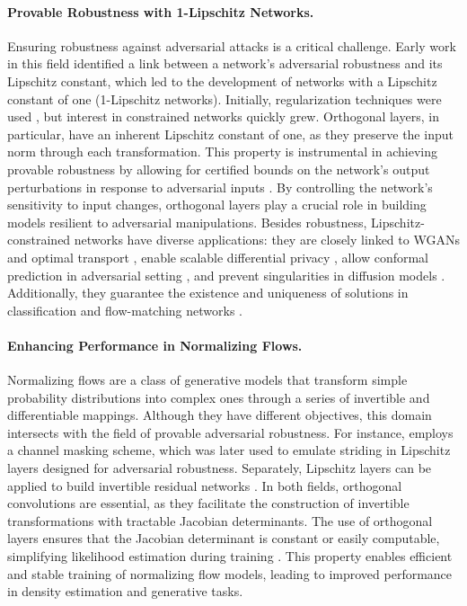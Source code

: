     
    \paragraph{Provable Robustness with 1-Lipschitz Networks.}
    Ensuring robustness against adversarial attacks is a critical challenge. Early work in this field \cite{szegedy_intriguing_2013} identified a link between a network's adversarial robustness and its Lipschitz constant, which led to the development of networks with a Lipschitz constant of one (1-Lipschitz networks). Initially, regularization techniques were used \cite{cisse2017parseval}, but interest in constrained networks quickly grew. Orthogonal layers, in particular, have an inherent Lipschitz constant of one, as they preserve the input norm through each transformation. This property is instrumental in achieving provable robustness by allowing for certified bounds on the network's output perturbations in response to adversarial inputs \cite{anil_sorting_2019}. By controlling the network's sensitivity to input changes, orthogonal layers play a crucial role in building models resilient to adversarial manipulations.
    Besides robustness, Lipschitz-constrained networks have diverse applications: they are closely linked to WGANs and optimal transport \cite{arjovsky2017wasserstein, bethune2024deep}, enable scalable differential privacy \cite{bethunedp}, allow conformal prediction in adversarial setting \cite{massena2025efficient}, and prevent singularities in diffusion models \cite{yang2023lipschitz}. Additionally, they guarantee the existence and uniqueness of solutions in classification \cite{bethune_pay_2022} and flow-matching networks \cite{perko2013differential, coddington1956theory}.
    
    \paragraph{Enhancing Performance in Normalizing Flows.}
    Normalizing flows are a class of generative models that transform simple probability distributions into complex ones through a series of invertible and differentiable mappings. Although they have different objectives, this domain intersects with the field of provable adversarial robustness. For instance, \cite{dinh2016density, rezende2015variational} employs a channel masking scheme, which was later used to emulate striding in Lipschitz layers designed for adversarial robustness. Separately, Lipschitz layers can be applied to build invertible residual networks \cite{behrmann2019invertible}. In both fields, orthogonal convolutions are essential, as they facilitate the construction of invertible transformations with tractable Jacobian determinants. The use of orthogonal layers ensures that the Jacobian determinant is constant or easily computable, simplifying likelihood estimation during training \cite{kingma2018glow}. This property enables efficient and stable training of normalizing flow models, leading to improved performance in density estimation and generative tasks.
    

